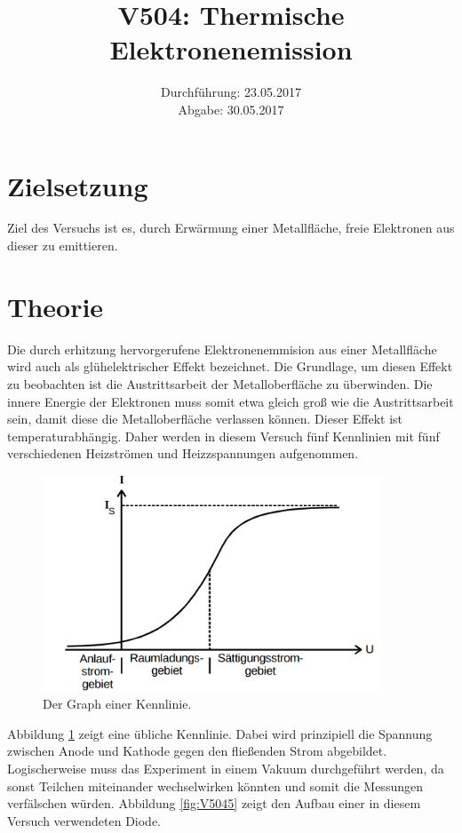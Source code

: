 \documentclass[
  bibliography=totoc,     %
  captions=tableheading,  %
  titlepage=firstiscover, %
]{scrartcl}
\title{V504: Thermische Elektronenemission}
\author{
  Simon Schulte
  \texorpdfstring{
    \\
    \href{mailto:simon.schulte@udo.edu}{simon.schulte@udo.edu}
  }{}
  \texorpdfstring{\and}{, }
  Tim Sedlaczek
  \texorpdfstring{
    \\
    \href{mailto:tim.sedlaczek@udo.edu}{tim.sedlaczek@udo.edu}
  }{}
}
\date{Durchführung: 23.05.2017\\
      Abgabe: 30.05.2017}
\begin{document}
\maketitle
\thispagestyle{empty}
\tableofcontents
\newpage
\setcounter{page}{1}
\section{Zielsetzung}
\label{sec:zielsetzung}
Ziel des Versuchs ist es, durch Erwärmung einer Metallfläche, freie Elektronen aus dieser zu emittieren.
\section{Theorie}
\label{sec:theorie}
Die durch erhitzung hervorgerufene Elektronenemmision aus einer Metallfläche wird auch als glühelektrischer Effekt bezeichnet. Die Grundlage, um diesen Effekt zu beobachten ist die Austrittsarbeit der Metalloberfläche zu überwinden. Die innere Energie der Elektronen muss somit etwa gleich groß wie die Austrittsarbeit sein, damit diese die Metalloberfläche verlassen können. Dieser Effekt ist temperaturabhängig. Daher werden in diesem Versuch fünf Kennlinien mit fünf verschiedenen Heizströmen und Heizzspannungen aufgenommen.
\begin{figure}[htb]
  \centering
  \includegraphics[width=0.9\textwidth]{V5044.png}
  \caption{Der Graph einer Kennlinie. \cite{anleitung}}
  \label{fig:V5044}
\end{figure}
\noindent
Abbildung \ref{fig:V5044} zeigt eine übliche Kennlinie. Dabei wird prinzipiell  die Spannung zwischen Anode und Kathode gegen den fließenden Strom abgebildet. Logischerweise muss das Experiment in einem Vakuum durchgeführt werden, da sonst Teilchen miteinander wechselwirken könnten und somit die Messungen verfälschen würden. Abbildung \ref{fig:V5045} zeigt den Aufbau einer in diesem Versuch verwendeten Diode.
\end{document}
